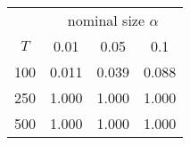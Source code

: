 % 
\begin{tabular}{cccc}
  \hline
  & \multicolumn{3}{c}{nominal size $\alpha$} \\
 $T$ & 0.01 & 0.05 & 0.1 \\
 \hline
100 & 0.011 & 0.039 & 0.088 \\ 
  250 & 1.000 & 1.000 & 1.000 \\ 
  500 & 1.000 & 1.000 & 1.000 \\ 
   \hline
\end{tabular}
